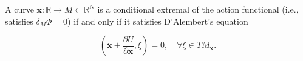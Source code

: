 A curve $\mathbf{x} : \mathbb{R} \to M \subset \mathbb{R}^N$ is a conditional extremal of the action functional (i.e., satisfies $\delta_M \Phi = 0$) if and only if it satisfies D'Alembert's equation

$$\left( \ddot{\mathbf{x}} + \frac{\partial U}{\partial \mathbf{x}}, \xi \right) = 0, \quad \forall \xi \in TM_{\mathbf{x}}.$$
